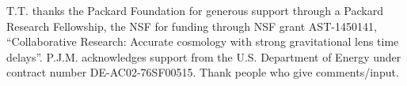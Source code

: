 %
%


\begin{acknowledgements}
T.T. thanks the Packard Foundation for generous support through a
Packard Research Fellowship, the NSF for funding through NSF grant
AST-1450141, ``Collaborative Research: Accurate cosmology with strong
gravitational lens time delays''.
P.J.M. acknowledges support from the U.S.
Department of Energy under contract number DE-AC02-76SF00515.
%
Thank people who give comments/input.
\end{acknowledgements}



